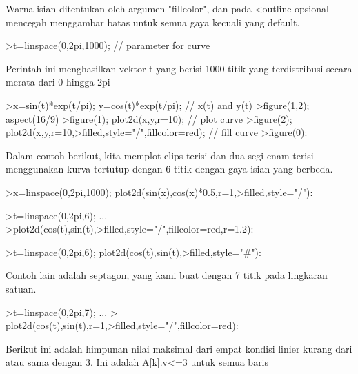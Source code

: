 \documentclass[a4paper,10pt]{article}
\begin{document}
\begin{eulernotebook}
\begin{eulercomment}
\begin{eulercomment}
\begin{eulercomment}
\begin{eulercomment}
\begin{eulercomment}
Warna isian ditentukan oleh argumen "fillcolor", dan pada \textless{}outline
opsional mencegah menggambar batas untuk semua gaya kecuali yang
default.
\end{eulercomment}
\begin{eulerprompt}
>t=linspace(0,2pi,1000); // parameter for curve
\end{eulerprompt}
\begin{eulercomment}
Perintah ini menghasilkan vektor t yang berisi 1000 titik yang
terdistribusi secara merata dari 0 hingga 2pi
\end{eulercomment}
\begin{eulerprompt}
>x=sin(t)*exp(t/pi); y=cos(t)*exp(t/pi); // x(t) and y(t)
>figure(1,2); aspect(16/9)
>figure(1); plot2d(x,y,r=10); // plot curve
>figure(2); plot2d(x,y,r=10,>filled,style="/",fillcolor=red); // fill curve
>figure(0):
\end{eulerprompt}
\begin{eulercomment}
Dalam contoh berikut, kita memplot elips terisi dan dua segi enam
terisi menggunakan kurva tertutup dengan 6 titik dengan gaya isian
yang berbeda.
\end{eulercomment}
\begin{eulerprompt}
>x=linspace(0,2pi,1000); plot2d(sin(x),cos(x)*0.5,r=1,>filled,style="/"):
\end{eulerprompt}
\begin{eulerprompt}
>t=linspace(0,2pi,6); ...
>plot2d(cos(t),sin(t),>filled,style="/",fillcolor=red,r=1.2):
\end{eulerprompt}
\begin{eulerprompt}
>t=linspace(0,2pi,6); plot2d(cos(t),sin(t),>filled,style="#"):
\end{eulerprompt}
\begin{eulercomment}
Contoh lain adalah septagon, yang kami buat dengan 7 titik pada
lingkaran satuan.
\end{eulercomment}
\begin{eulerprompt}
>t=linspace(0,2pi,7);  ...
> plot2d(cos(t),sin(t),r=1,>filled,style="/",fillcolor=red):
\end{eulerprompt}
\begin{eulercomment}
Berikut ini adalah himpunan nilai maksimal dari empat kondisi linier
kurang dari atau sama dengan 3. Ini adalah A[k].v\textless{}=3 untuk semua baris

\end{eulercomment}
\end{eulercomment}
\end{eulercomment}
\end{eulercomment}
\end{eulercomment}
\end{eulernotebook}
\end{document}
